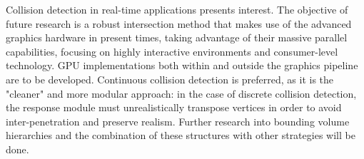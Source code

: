 Collision detection in real-time applications presents interest. The objective of future research is a robust intersection method that makes use of the advanced graphics hardware in present times, taking advantage of their massive parallel capabilities, focusing on highly interactive environments and consumer-level technology. GPU implementations both within and outside the graphics pipeline are to be developed. Continuous collision detection is preferred, as it is the "cleaner" and more modular approach: in the case of discrete collision detection, the response module must unrealistically transpose vertices in order to avoid inter-penetration and preserve realism. Further research into bounding volume hierarchies and the combination of these structures with other strategies will be done.